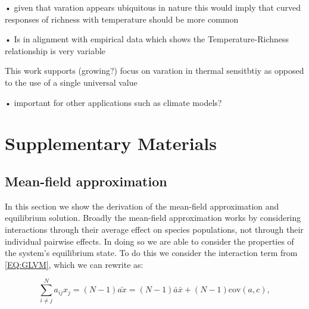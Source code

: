 \documentclass{article}
\begin{document}
    •   given that varation appears ubiquitous in nature this would imply that curved responses of richness with temperature should be more common
    
    •   Is in alignment with empirical data which shows the Temperature-Richness relationship is very variable

This work supports (growing?) focus on varation in thermal sensitbtiy as opposed to the use of a single universal value
    
    • important for other applications such as climate models?

\newpage




\renewcommand{\thepage}{S\arabic{page}} 
\renewcommand{\thesection}{S\arabic{section}}  
\renewcommand{\thetable}{S\arabic{table}}  
\renewcommand{\thefigure}{S\arabic{figure}} 
\renewcommand{\figurename}{Supplemental Material, Figure} 

\setcounter{section}{0}

\section*{Supplementary Materials}

\subsection{Mean-field approximation} \label{SI_Sec:Meanfield}
In this section we show the derivation of the mean-field approximation and equilibrium solution. Broadly the mean-field approximation works by considering interactions through their average effect on species populations, not through their individual pairwise effects. In doing so we are able to consider the properties of the system's equilibrium state.  To do this we consider the interaction term from \cref{EQ:GLVM}, which we can rewrite as:

\begin{equation} \label{EQ:mean_int} 
    \sum^N_{i \neq j} a_{ij} x_j = (N-1) \bar{a x} = (N-1) \bar{a} \bar{x} + (N-1) \text{cov}(a,c),
\end{equation}
\end{document}
